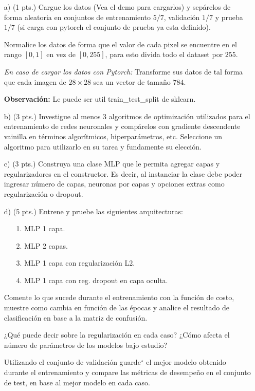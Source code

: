 \documentclass[11pt,letterpaper]{article}
\begin{document}
\begin{enumerate}

\item[a)](1 pts.) Cargue los datos (Vea el demo para cargarlos) y sepárelos de forma aleatoria en conjuntos de entrenamiento $5/7$, validación $1/7$ y prueba $1/7$ (si carga con pytorch el conjunto de prueba ya esta definido).

Normalice los datos de forma que el valor de cada pixel se encuentre en el rango $[0, 1]$ en vez de $[0, 255]$, para esto divida todo el dataset por $255$. 
    
\textit{En caso de cargar los datos con Pytorch:} Transforme sus datos de tal forma que cada imagen de $28 \times 28$ sea un vector de tamaño $784$.

\textbf{Observación:} Le puede ser util train\_test\_split de sklearn.

\item[b)](3 pts.) Investigue al menos 3 algoritmos de optimización utilizados para el entrenamiento de redes neuronales y compárelos con gradiente descendente vainilla en términos algorítmicos, hiperparámetros, etc. Seleccione un algoritmo para utilizarlo en su tarea y fundamente su elección.

\item[c)](3 pts.) Construya una clase MLP que le permita agregar capas y regularizadores en el constructor. Es decir, al instanciar la clase debe poder ingresar número de capas, neuronas por capas y opciones extras como regularización o dropout.

\item[d)](5 pts.) Entrene y pruebe las siguientes arquitecturas:
\begin{enumerate}
    \item[1.] MLP 1 capa.
    \item[2.] MLP 2 capas.
    \item[3.] MLP 1 capa con regularización L2.
    \item[4.] MLP 1 capa con reg. dropout en capa oculta.
\end{enumerate}

Comente lo que sucede durante el entrenamiento con la función de costo, muestre como cambia en función de las épocas y analice el resultado de clasificación en base a la matriz de confusión.

¿Qué puede decir sobre la regularización en cada caso? ¿Cómo afecta el número de parámetros de los modelos bajo estudio?

Utilizando el conjunto de validación guarde$^{\star}$ el mejor modelo obtenido durante el entrenamiento y compare las métricas de desempeño en el conjunto de test, en base al mejor modelo en cada caso.


\end{enumerate}
\end{document}
